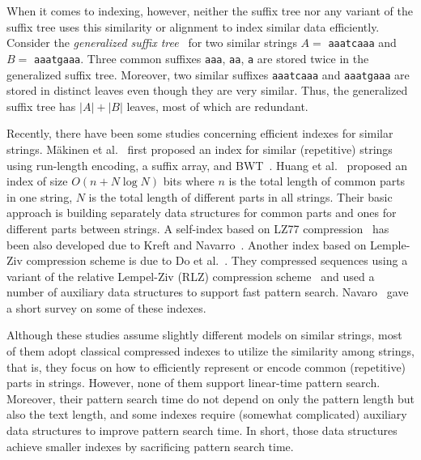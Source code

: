 \documentclass{llncs}
\newcommand{\partitle}[1]{}                        \newcommand{\commentout}[1]{}
\begin{document}
When it comes to indexing, however,
 neither the suffix tree nor any variant of the suffix tree
 uses this similarity or alignment to index similar data efficiently.
Consider the {\em generalized suffix tree}~\cite{Amir&Farach:94,Gusfield:97}
 for two similar strings $A =$ {\tt aaatcaaa} and $B =$ {\tt aaatgaaa}.
Three common suffixes {\tt aaa}, {\tt aa}, {\tt a}
 are stored twice in the generalized suffix tree.
Moreover, two similar suffixes {\tt aaatcaaa} and {\tt aaatgaaa}
 are stored in distinct leaves
 even though they are very similar.
Thus, the generalized suffix tree has $|A|+|B|$ leaves, most of which are redundant.


\partitle{Previous works}

Recently, there have been some studies concerning efficient indexes for similar strings.
M\"{a}kinen et al.~\cite{recomb/MakinenNSV09,jcb/MakinenNSV10}
 first proposed an index for similar (repetitive) strings
 using run-length encoding, a suffix array, and BWT~\cite{Burrows&Wheeler:94}.
Huang et al.~\cite{aaim/HuangLSTY10} proposed an index of size $O(n + N\log N)$ bits
 where $n$ is the total length of common parts in one string,
 $N$ is the total length of different parts in all strings.
Their basic approach is building separately data structures for common parts
 and ones for different parts between strings.
A self-index based on LZ77 compression~\cite{Ziv&Lempel:77}
 has been also developed due to Kreft and Navarro~\cite{Kreft&Navarro:XX}.
Another index based on Lemple-Ziv compression scheme is
 due to Do et al.~\cite{aaim/DoJSS12}.
They compressed sequences using a variant of the relative Lempel-Ziv (RLZ) compression
 scheme~\cite{spire/KuruppuPZ10}
 and used a number of auxiliary data structures to support fast pattern search.
Navaro~\cite{iwoca/Navarro12} gave a short survey on some of these indexes.


\partitle{Motivation}

Although these studies assume slightly different models on similar strings,
 most of them adopt classical compressed indexes to utilize the similarity among strings,
 that is, they focus on how to efficiently represent or encode common (repetitive) parts in strings.
However, none of them support linear-time pattern search.
Moreover, their pattern search time do not depend on only the pattern length
 but also the text length,
 and some indexes require (somewhat complicated) auxiliary data structures
 to improve pattern search time.
In short, those data structures achieve smaller indexes
by sacrificing pattern search time.
\end{document}
